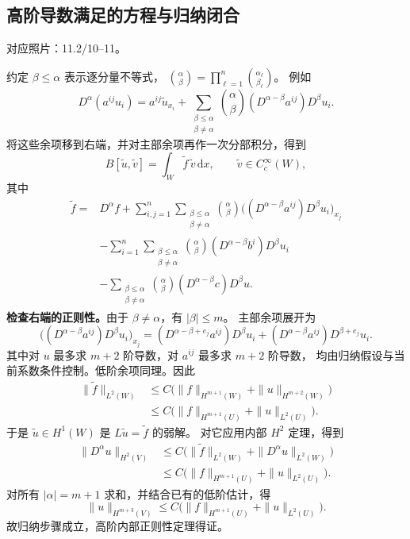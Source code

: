 \documentclass[UTF8,a4paper,11pt,fontset=fandol]{ctexart}
\newcommand{\dd}{\,\mathrm d}
\newcommand{\source}[1]{{\small\color{notegray}对应照片：#1。}\par}
\begin{document}
\subsection{高阶导数满足的方程与归纳闭合}
\source{11.2/10--11}
约定 $\beta\leq\alpha$ 表示逐分量不等式，
$\binom\alpha\beta=\prod_{\ell=1}^n\binom{\alpha_\ell}{\beta_\ell}$。
例如
\[
D^\alpha(a^{ij}u_i)
=a^{ij}\widetilde u_{x_i}
 +\sum_{\substack{\beta\leq\alpha\\\beta\ne\alpha}}
 \binom\alpha\beta(D^{\alpha-\beta}a^{ij})D^\beta u_i.
\]
将这些余项移到右端，并对主部余项再作一次分部积分，得到
\[
B[\widetilde u,\widetilde v]=\int_W\widetilde f\,\widetilde v\dd x,
\qquad\widetilde v\in C_c^\infty(W),
\]
其中
\[
\boxed{\begin{aligned}
\widetilde f={}&D^\alpha f
 +\sum_{i,j=1}^n\sum_{\substack{\beta\leq\alpha\\\beta\ne\alpha}}
 \binom\alpha\beta
 \bigl((D^{\alpha-\beta}a^{ij})D^\beta u_i\bigr)_{x_j}\\
&-\sum_{i=1}^n\sum_{\substack{\beta\leq\alpha\\\beta\ne\alpha}}
 \binom\alpha\beta(D^{\alpha-\beta}b^i)D^\beta u_i\\
&-\sum_{\substack{\beta\leq\alpha\\\beta\ne\alpha}}
 \binom\alpha\beta(D^{\alpha-\beta}c)D^\beta u.
\end{aligned}}
\]
\textbf{检查右端的正则性。}由于 $\beta\ne\alpha$，有 $|\beta|\leq m$。
主部余项展开为
\[
\bigl((D^{\alpha-\beta}a^{ij})D^\beta u_i\bigr)_{x_j}
=(D^{\alpha-\beta+e_j}a^{ij})D^\beta u_i
 +(D^{\alpha-\beta}a^{ij})D^{\beta+e_j}u_i.
\]
其中对 $u$ 最多求 $m+2$ 阶导数，对 $a^{ij}$ 最多求 $m+2$ 阶导数，
均由归纳假设与当前系数条件控制。低阶余项同理。因此
\[
\begin{aligned}
\|\widetilde f\|_{L^2(W)}
&\leq C\bigl(\|f\|_{H^{m+1}(W)}+\|u\|_{H^{m+2}(W)}\bigr)\\
&\leq C\bigl(\|f\|_{H^{m+1}(U)}+\|u\|_{L^2(U)}\bigr).
\end{aligned}
\]
于是 $\widetilde u\in H^1(W)$ 是 $L\widetilde u=\widetilde f$ 的弱解。
对它应用内部 $H^2$ 定理，得到
\[
\begin{aligned}
\|D^\alpha u\|_{H^2(V)}
&\leq C\bigl(\|\widetilde f\|_{L^2(W)}+\|D^\alpha u\|_{L^2(W)}\bigr)\\
&\leq C\bigl(\|f\|_{H^{m+1}(U)}+\|u\|_{L^2(U)}\bigr).
\end{aligned}
\]
对所有 $|\alpha|=m+1$ 求和，并结合已有的低阶估计，得
\[
\boxed{\|u\|_{H^{m+3}(V)}
\leq C\bigl(\|f\|_{H^{m+1}(U)}+\|u\|_{L^2(U)}\bigr).}
\]
故归纳步骤成立，高阶内部正则性定理得证。
\end{document}
